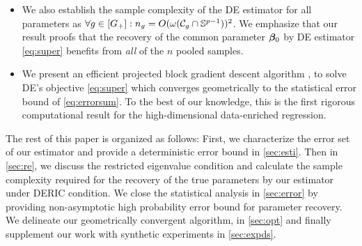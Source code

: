 \begin{itemize}[leftmargin = .4cm]
	\item We also establish the sample complexity of the DE estimator for all parameters as $\forall g \in [G_+]: n_g = O(\omega(\cC_g \cap \sphere))^2$. We emphasize that our result proofs that the recovery of the common parameter $\boldsymbol{\beta}_0$ by DE estimator \cref{eq:super} benefits from \emph{all} of the $n$ pooled samples.
	\item We present an efficient projected block gradient descent algorithm \emph{\dc}, to solve DE's objective \cref{eq:super} which converges geometrically to the statistical error bound of \cref{eq:errorsum}. To the best of our knowledge, this is the first rigorous computational result for the high-dimensional data-enriched regression.
\end{itemize}

The rest of this paper is organized as follows:
First, we characterize the error set of our estimator and provide a deterministic error bound in \cref{sec:esti}.
Then in \cref{sec:re}, we discuss the restricted eigenvalue condition and calculate the sample complexity required for the recovery of the true parameters by our estimator under DERIC condition.
We close the statistical analysis in \cref{sec:error} by providing non-asymptotic high probability error bound for parameter recovery.
We delineate our geometrically convergent algorithm, \dc{} in \cref{sec:opt} and finally supplement our work with synthetic experiments in \cref{sec:expds}.%


